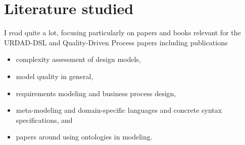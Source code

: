 \section{Literature studied}

I read quite a lot, focusing particularly on papers and books relevant for the URDAD-DSL and Quality-Driven Process papers including publications 
\begin{itemize}
 \item complexity assessment of design models,
 \item model quality in general,
 \item requirements modeling and business process design,
 \item meta-modeling and domain-specific languages and concrete syntax specifications, and
  \item papers around using ontologies in modeling.
\end{itemize}


